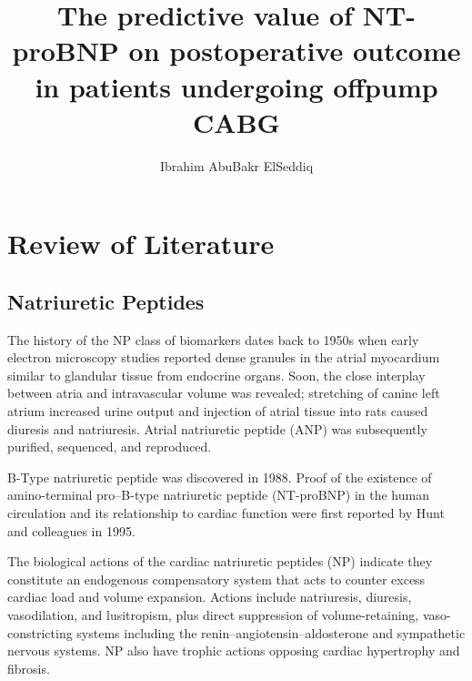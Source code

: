 \documentclass[14pt,a4paper,onecolumn]{extarticle}
\author{Ibrahim AbuBakr ElSeddiq}
\title{The predictive value of NT-proBNP on postoperative outcome in patients undergoing offpump CABG}
\begin{document}
\maketitle

\clearpage
\section{Review of Literature}

\subsection{Natriuretic Peptides}

The history of the NP class of biomarkers dates back to 1950s when early electron microscopy studies reported dense granules in the atrial myocardium similar to glandular tissue from endocrine organs. Soon, the close interplay between atria and intravascular volume was revealed; stretching of canine left atrium increased urine output and injection of atrial tissue into rats caused diuresis and natriuresis. Atrial natriuretic peptide (ANP) was subsequently purified, sequenced, and reproduced. \citep{Gaggin2014} %


B-Type natriuretic peptide was discovered in 1988. Proof of the existence of amino-terminal pro–B-type natriuretic peptide (NT-proBNP) in the human circulation and its relationship to cardiac function were first reported by Hunt and colleagues in 1995. \citep{Richards2018} %

The biological actions of the cardiac natriuretic peptides (NP) indicate they constitute an endogenous compensatory system that acts to counter excess cardiac load and volume expansion. Actions include natriuresis, diuresis, vasodilation, and lusitropism, plus direct suppression of volume-retaining, vaso-constricting systems including the renin–angiotensin–aldosterone and sympathetic nervous systems. NP also have trophic actions opposing cardiac hypertrophy and fibrosis. \citep{Richards2018} %
\end{document}
